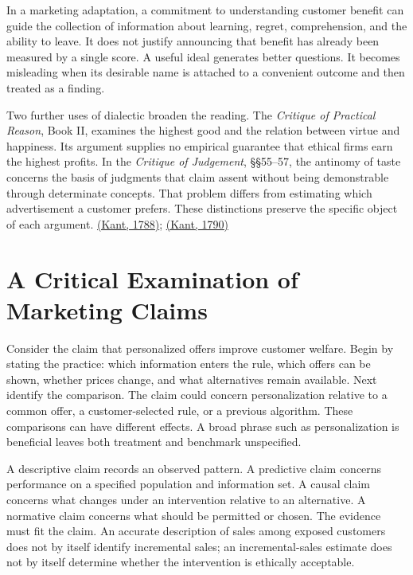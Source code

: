 In a marketing adaptation, a commitment to understanding customer
benefit can guide the collection of information about learning, regret,
comprehension, and the ability to leave. It does not justify announcing
that benefit has already been measured by a single score. A useful ideal
generates better questions. It becomes misleading when its desirable
name is attached to a convenient outcome and then treated as a finding.

Two further uses of dialectic broaden the reading. The \emph{Critique of
Practical Reason}, Book II, examines the highest good and the relation
between virtue and happiness. Its argument supplies no empirical
guarantee that ethical firms earn the highest profits. In the
\emph{Critique of Judgement}, §§55--57, the antinomy of taste concerns
the basis of judgments that claim assent without being demonstrable
through determinate concepts. That problem differs from estimating which
advertisement a customer prefers. These distinctions preserve the
specific object of each argument.
\href{https://www.gutenberg.org/files/5683/5683-h/5683-h.htm}{(Kant,
1788)};
\href{https://www.gutenberg.org/files/48433/48433-h/48433-h.htm}{(Kant,
1790)}


\hypertarget{M09-a-critical-examination-of-marketing-claims}{%
\section{A Critical Examination of Marketing
Claims}\label{M09-a-critical-examination-of-marketing-claims}}

\noindent \noindent Consider the claim that personalized offers improve customer
welfare. Begin by stating the practice: which information enters the
rule, which offers can be shown, whether prices change, and what
alternatives remain available. Next identify the comparison. The claim
could concern personalization relative to a common offer, a
customer-selected rule, or a previous algorithm. These comparisons can
have different effects. A broad phrase such as personalization is
beneficial leaves both treatment and benchmark unspecified.

A descriptive claim records an observed pattern. A predictive claim
concerns performance on a specified population and information set. A
causal claim concerns what changes under an intervention relative to an
alternative. A normative claim concerns what should be permitted or
chosen. The evidence must fit the claim. An accurate description of
sales among exposed customers does not by itself identify incremental
sales; an incremental-sales estimate does not by itself determine
whether the intervention is ethically acceptable.

